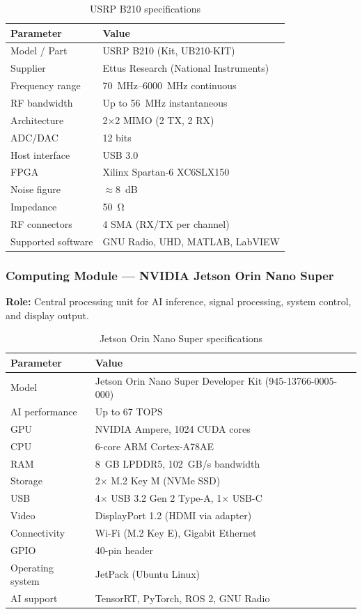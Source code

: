 \documentclass[12pt,a4paper]{article}
\begin{document}
\begin{table}[H]
\centering
\caption{USRP B210 specifications}
\begin{tabular}{@{}ll@{}}
\toprule
\textbf{Parameter} & \textbf{Value} \\
\midrule
Model / Part & USRP B210 (Kit, UB210-KIT) \\
Supplier & Ettus Research (National Instruments) \\
Frequency range & \qtyrange{70}{6000}{\MHz} continuous \\
RF bandwidth & Up to \qty{56}{\MHz} instantaneous \\
Architecture & 2$\times$2 MIMO (2 TX, 2 RX) \\
ADC/DAC & 12 bits \\
Host interface & USB 3.0 \\
FPGA & Xilinx Spartan-6 XC6SLX150 \\
Noise figure & $\approx$\qty{8}{\dB} \\
Impedance & \qty{50}{\ohm} \\
RF connectors & 4 SMA (RX/TX per channel) \\
Supported software & GNU Radio, UHD, MATLAB, LabVIEW \\
\bottomrule
\end{tabular}
\end{table}

\subsubsection{Computing Module --- NVIDIA Jetson Orin Nano Super}

\textbf{Role:} Central processing unit for AI inference, signal processing, system control, and display output.

\begin{table}[H]
\centering
\caption{Jetson Orin Nano Super specifications}
\begin{tabular}{@{}ll@{}}
\toprule
\textbf{Parameter} & \textbf{Value} \\
\midrule
Model & Jetson Orin Nano Super Developer Kit (945-13766-0005-000) \\
AI performance & Up to 67 TOPS \\
GPU & NVIDIA Ampere, 1024 CUDA cores \\
CPU & 6-core ARM Cortex-A78AE \\
RAM & 8~GB LPDDR5, 102~GB/s bandwidth \\
Storage & 2$\times$ M.2 Key M (NVMe SSD) \\
USB & 4$\times$ USB 3.2 Gen 2 Type-A, 1$\times$ USB-C \\
Video & DisplayPort 1.2 (HDMI via adapter) \\
Connectivity & Wi-Fi (M.2 Key E), Gigabit Ethernet \\
GPIO & 40-pin header \\
Operating system & JetPack (Ubuntu Linux) \\
AI support & TensorRT, PyTorch, ROS 2, GNU Radio \\
\bottomrule
\end{tabular}
\end{table}
\end{document}
